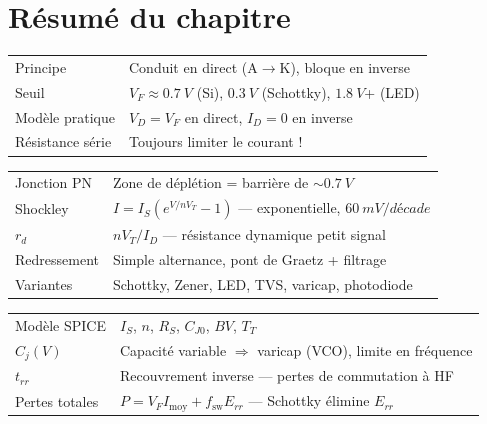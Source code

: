 \documentclass[12pt,a4paper,twoside]{book}
\begin{document}
\section*{Résumé du chapitre}

\begin{bases}[title={\color{white} Résumé --- Les Bases}]
\begin{center}
\renewcommand{\arraystretch}{1.3}
\begin{tabular}{p{4cm}p{9cm}}
\toprule
Principe & Conduit en direct (A$\to$K), bloque en inverse \\
Seuil & $V_F \approx \SI{0.7}{V}$ (Si), $\SI{0.3}{V}$ (Schottky), $\SI{1.8}{V}$+ (LED) \\
Modèle pratique & $V_D = V_F$ en direct, $I_D = 0$ en inverse \\
Résistance série & Toujours limiter le courant ! \\
\bottomrule
\end{tabular}
\end{center}
\end{bases}

\begin{approfondissement}[title={\color{white} Résumé --- Approfondissement}]
\begin{center}
\renewcommand{\arraystretch}{1.3}
\begin{tabular}{p{4cm}p{9cm}}
\toprule
Jonction PN & Zone de déplétion = barrière de $\sim\SI{0.7}{V}$ \\
Shockley & $I = I_S(e^{V/nV_T}-1)$ --- exponentielle, $\SI{60}{mV/décade}$ \\
$r_d$ & $nV_T/I_D$ --- résistance dynamique petit signal \\
Redressement & Simple alternance, pont de Graetz + filtrage \\
Variantes & Schottky, Zener, LED, TVS, varicap, photodiode \\
\bottomrule
\end{tabular}
\end{center}
\end{approfondissement}

\begin{ingenieur}[title={\color{white} Résumé --- Niveau Ingénieur}]
\begin{center}
\renewcommand{\arraystretch}{1.3}
\begin{tabular}{p{4cm}p{9cm}}
\toprule
Modèle SPICE & $I_S$, $n$, $R_S$, $C_{J0}$, $BV$, $T_T$ \\
$C_j(V)$ & Capacité variable $\Rightarrow$ varicap (VCO), limite en fréquence \\
$t_{rr}$ & Recouvrement inverse --- pertes de commutation à HF \\
Pertes totales & $P = V_F I_{\text{moy}} + f_{\text{sw}} E_{rr}$ --- Schottky élimine $E_{rr}$ \\
\bottomrule
\end{tabular}
\end{center}
\end{ingenieur}
\end{document}
